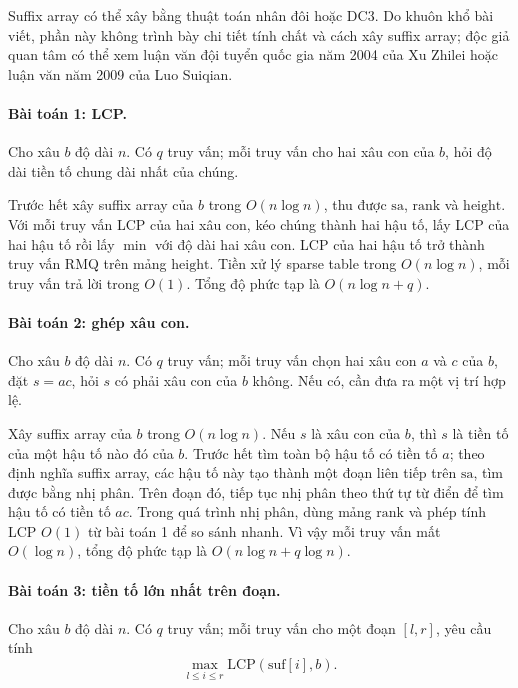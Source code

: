 \documentclass[11pt]{article}
\begin{document}
Suffix array có thể xây bằng thuật toán nhân đôi hoặc DC3. Do khuôn khổ bài
viết, phần này không trình bày chi tiết tính chất và cách xây suffix array; độc
giả quan tâm có thể xem luận văn đội tuyển quốc gia năm 2004 của Xu Zhilei hoặc
luận văn năm 2009 của Luo Suiqian.

\paragraph{Bài toán 1: LCP.}
Cho xâu \(b\) độ dài \(n\). Có \(q\) truy vấn; mỗi truy vấn cho hai xâu con của
\(b\), hỏi độ dài tiền tố chung dài nhất của chúng.

Trước hết xây suffix array của \(b\) trong \(O(n\log n)\), thu được
\(\mathrm{sa}\), \(\mathrm{rank}\) và \(\mathrm{height}\). Với mỗi truy vấn LCP
của hai xâu con, kéo chúng thành hai hậu tố, lấy LCP của hai hậu tố rồi lấy
\(\min\) với độ dài hai xâu con. LCP của hai hậu tố trở thành truy vấn RMQ trên
mảng \(\mathrm{height}\). Tiền xử lý sparse table trong \(O(n\log n)\), mỗi
truy vấn trả lời trong \(O(1)\). Tổng độ phức tạp là \(O(n\log n+q)\).

\paragraph{Bài toán 2: ghép xâu con.}
Cho xâu \(b\) độ dài \(n\). Có \(q\) truy vấn; mỗi truy vấn chọn hai xâu con
\(a\) và \(c\) của \(b\), đặt \(s=ac\), hỏi \(s\) có phải xâu con của \(b\)
không. Nếu có, cần đưa ra một vị trí hợp lệ.

Xây suffix array của \(b\) trong \(O(n\log n)\). Nếu \(s\) là xâu con của \(b\),
thì \(s\) là tiền tố của một hậu tố nào đó của \(b\). Trước hết tìm toàn bộ hậu
tố có tiền tố \(a\); theo định nghĩa suffix array, các hậu tố này tạo thành một
đoạn liên tiếp trên \(\mathrm{sa}\), tìm được bằng nhị phân. Trên đoạn đó, tiếp
tục nhị phân theo thứ tự từ điển để tìm hậu tố có tiền tố \(ac\). Trong quá
trình nhị phân, dùng mảng \(\mathrm{rank}\) và phép tính LCP \(O(1)\) từ bài
toán 1 để so sánh nhanh. Vì vậy mỗi truy vấn mất \(O(\log n)\), tổng độ phức
tạp là \(O(n\log n+q\log n)\).

\paragraph{Bài toán 3: tiền tố lớn nhất trên đoạn.}
Cho xâu \(b\) độ dài \(n\). Có \(q\) truy vấn; mỗi truy vấn cho một đoạn
\([l,r]\), yêu cầu tính
\[
  \max_{l\le i\le r}\mathrm{LCP}(\mathrm{suf}[i],b).
\]
\end{document}
